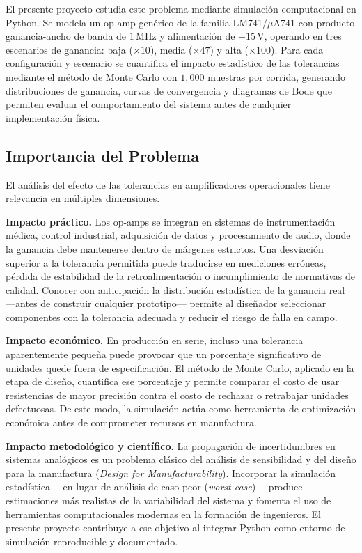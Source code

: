 ﻿\documentclass[12pt, letterpaper]{article}
\begin{document}
El presente proyecto estudia este problema mediante simulación computacional en
Python. Se modela un op-amp genérico de la familia LM741/\(\mu\)A741 con producto %
ganancia-ancho de banda de \(1\,\text{MHz}\) y alimentación de \(\pm15\,\text{V}\),
operando en tres escenarios de ganancia: baja (\(\times 10\)), media (\(\times 47\))
y alta (\(\times 100\)). Para cada configuración y escenario se cuantifica el
impacto estadístico de las tolerancias mediante el método de Monte Carlo con
\(1{,}000\) muestras por corrida, generando distribuciones de ganancia, curvas de
convergencia y diagramas de Bode que permiten evaluar el comportamiento del sistema
antes de cualquier implementación física.

\subsection{Importancia del Problema}

El análisis del efecto de las tolerancias en amplificadores operacionales tiene
relevancia en múltiples dimensiones.

\textbf{Impacto práctico.}
Los op-amps se integran en sistemas de instrumentación médica, control industrial,
adquisición de datos y procesamiento de audio, donde la ganancia debe mantenerse
dentro de márgenes estrictos. Una desviación superior a la tolerancia permitida
puede traducirse en mediciones erróneas, pérdida de estabilidad de la
retroalimentación o incumplimiento de normativas de calidad. Conocer con
anticipación la distribución estadística de la ganancia real —antes de construir
cualquier prototipo— permite al diseñador seleccionar componentes con la tolerancia
adecuada y reducir el riesgo de falla en campo.

\textbf{Impacto económico.}
En producción en serie, incluso una tolerancia aparentemente pequeña puede provocar
que un porcentaje significativo de unidades quede fuera de especificación. El método
de Monte Carlo, aplicado en la etapa de diseño, cuantifica ese porcentaje y
permite comparar el costo de usar resistencias de mayor precisión contra el costo
de rechazar o retrabajar unidades defectuosas. De este modo, la simulación actúa
como herramienta de optimización económica antes de comprometer recursos en
manufactura.

\textbf{Impacto metodológico y científico.}
La propagación de incertidumbres en sistemas analógicos es un problema clásico del
análisis de sensibilidad y del diseño para la manufactura (\textit{Design for
Manufacturability}). Incorporar la simulación estadística —en lugar de análisis de
caso peor (\textit{worst-case})— produce estimaciones más realistas de la
variabilidad del sistema y fomenta el uso de herramientas computacionales modernas
en la formación de ingenieros. El presente proyecto contribuye a ese objetivo al
integrar Python como entorno de simulación reproducible y documentado.
\end{document}
